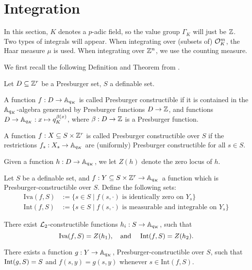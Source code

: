 \section{Integration}
In this section, $K$ denotes a $p$-adic field, so the value group $\Gamma_K$ will just be $\Z$. Two types of integrals will appear. When integrating over (subsets of) $\cO_K^m$, the Haar measure $\mu$ is used. When integrating over $\Z^n$, we use the counting measure.

We first recall the following Definition and Theorem from \cite{Clu-Gor-Hal-14}.
\begin{defn}Let $D \subseteq \ZZ^r$ be a Presburger set, $S$ a definable set.
\item A function $f: D \to \AA_{q_K}$ is called Presburger constructible if it is contained in the $\AA_{q_K}$-algebra generated by Presburger functions $D\to \ZZ$, and functions $D\to \AA_{q_K}: x \mapsto q_K^{\beta(x)}$, where $\beta:D \to \ZZ$ is a Presburger function.
\item A function $f:X\subseteq S \times \ZZ^r$ is called Presburger constructible over $S$ if  the restrictions $f_s: X_s \to \AA_{q_K}$ are (uniformly) Presburger constructible for all $s \in S$. 
\item Given a function $h:D\to \AA_{q_K}$, we let $Z(h)$ denote the zero locus of $h$.
\end{defn}
\begin{def-theorem}\label{thm:presburgerloci} Let $S$ be a definable set, 
and $f:Y\subseteq S\times \ZZ^r\to \AA_{q_K}$ a function which is Presburger-constructible over $S$. Define the following sets:
\begin{align*}
\text{Iva}(f,S)&:=\{s \in S \mid f(s, \cdot) \text{ is identically zero on } Y_s\}\\
\text{Int}(f,S) &:=\{s \in S \mid f(s, \cdot) \text{ is measurable and integrable on } Y_s \}
\end{align*}
\item There exist $\Lm_2$-constructible functions $h_i: S \to \AA_{q_K}$, such that 
\[\text{Iva}(f,S) = Z(h_1), \text{\quad and \quad }
\text{Int}(f,S) = Z(h_2).\]
\item There exists a function $g: Y \to \AA_{q_K}$, Presburger-constructible over $S$, such that $\Int(g,S) = S$ and $f(s,y) = g(s,y)$ whenever $s \in \text{Int}(f,S)$.
\end{def-theorem}
